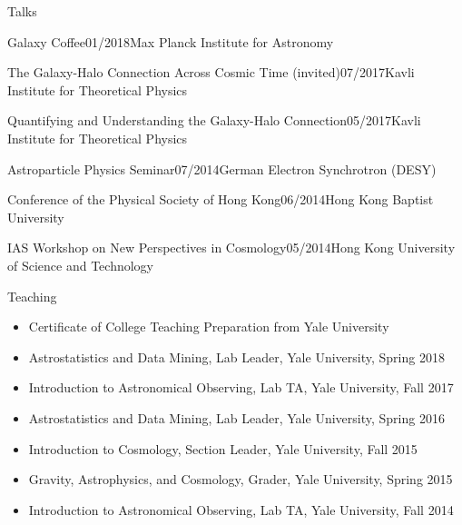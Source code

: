 \documentclass[11pt]{resume} %
\begin{document}
\begin{rSection}{Talks}
\begin{adjustwidth}{0.5cm}{}
    \begin{rSubsection}{Galaxy Coffee}{01/2018}{Max Planck Institute for Astronomy}{}\end{rSubsection}

    \begin{rSubsection}{The Galaxy-Halo Connection Across Cosmic Time (invited)}{07/2017}{Kavli Institute for Theoretical Physics}{}\end{rSubsection}

    \begin{rSubsection}{Quantifying and Understanding the Galaxy-Halo Connection}{05/2017}{Kavli Institute for Theoretical Physics}{}\end{rSubsection}

    \begin{rSubsection}{Astroparticle Physics Seminar}{07/2014}{German Electron Synchrotron (DESY)}{}\end{rSubsection}

    \begin{rSubsection}{Conference of the Physical Society of Hong Kong}{06/2014}{Hong Kong Baptist University}{}\end{rSubsection}

    \begin{rSubsection}{IAS Workshop on New Perspectives in Cosmology}{05/2014}{Hong Kong University of Science and Technology}{}\end{rSubsection}
  \end{adjustwidth}
\end{rSection}


\begin{rSection}{Teaching}
  \begin{itemize}[leftmargin=1.0cm, topsep=0pt,itemsep=0pt,partopsep=0pt, parsep=0pt]
    \item Certificate of College Teaching Preparation from Yale University
    \item Astrostatistics and Data Mining, Lab Leader, Yale University, Spring 2018
    \item Introduction to Astronomical Observing, Lab TA, Yale University, Fall 2017
    \item Astrostatistics and Data Mining, Lab Leader, Yale University, Spring 2016
    \item Introduction to Cosmology, Section Leader, Yale University, Fall 2015
    \item Gravity, Astrophysics, and Cosmology, Grader, Yale University, Spring 2015
    \item Introduction to Astronomical Observing, Lab TA, Yale University, Fall 2014
  \end{itemize}
\end{rSection}
\end{document}

